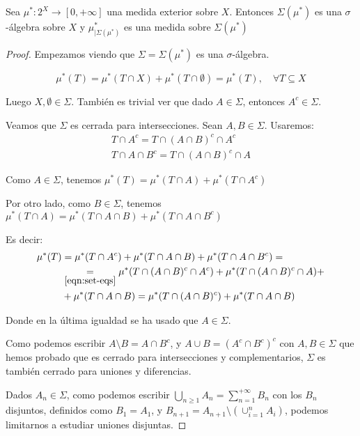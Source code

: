 \begin{theorem}
 Sea $\mu^\ast : 2^X \rightarrow [0, +\infty]$ una medida exterior sobre $X$. Entonces $\Sigma(\mu^\ast)$
 es una $\sigma$-álgebra sobre $X$ y $\mu^\ast_{|\Sigma(\mu^\ast)}$ es una medida sobre $\Sigma(\mu^\ast)$
 
 \label{th:outer-to-measure}
\end{theorem}

\begin{proof}
 Empezamos viendo que $\Sigma = \Sigma(\mu^\ast)$ es una $\sigma$-álgebra.

 \[\mu^\ast(T) = \mu^\ast(T\cap X) + \mu^\ast(T\cap \emptyset) = \mu^\ast(T), \quad \forall T\subseteq X\]
 
 Luego $X,\emptyset \in \Sigma$. También es trivial ver que dado $A\in \Sigma$, entonces $A^c \in \Sigma$.
 
 Veamos que $\Sigma$ es cerrada para intersecciones. Sean $A, B\in \Sigma$. Usaremos:
 \begin{align}
  T\cap A^c = T\cap (A\cap B)^c \cap A^c \nonumber\\
  T\cap A \cap B^c = T \cap (A\cap B)^c \cap A
  \label{eqn:set-eqs}\tag{$\ast$}
 \end{align}

 Como $A\in \Sigma$, tenemos $\mu^\ast(T) = \mu^\ast(T\cap A) + \mu^\ast(T\cap A^c)$
 
 Por otro lado, como $B\in \Sigma$, tenemos $\mu^\ast(T\cap A) = \mu^\ast(T\cap A\cap B) + \mu^\ast(T\cap A \cap B^c)$
 
 Es decir:
 \begin{align*}
  \mu^\ast(T) &= \mu^\ast(T\cap A^c) + \mu^\ast(T\cap A \cap B) + \mu^\ast(T\cap A \cap B^c) = \\
  & \underset{\eqref{eqn:set-eqs}}{=} \mu^\ast(T\cap (A\cap B)^c \cap A^c) + \mu^\ast(T \cap (A\cap B)^c \cap A) +\\
  &+ \mu^\ast(T\cap A \cap B) = \mu^\ast(T\cap (A \cap B)^c) + \mu^\ast(T\cap A \cap B)
 \end{align*}

 Donde en la última igualdad se ha usado que $A\in \Sigma$.
 
 Como podemos escribir $A\setminus B = A\cap B^c$, y $A\cup B = (A^c \cap B^c)^c$ con $A, B \in \Sigma$ que
 hemos probado que es cerrado para intersecciones y complementarios, $\Sigma$ es también cerrado para
 uniones y diferencias.
 
 Dados $A_n \in \Sigma$, como podemos escribir $\bigcup_{n\ge 1} A_n = \sum_{n=1}^{+\infty} B_n$ con los $B_n$ 
 disjuntos, definidos como $B_1 = A_1$, y $B_{n+1} = A_{n+1} \setminus\left(\cup_{i=1}^n A_i\right)$, 
 podemos limitarnos a estudiar uniones disjuntas.
 

\end{proof}
